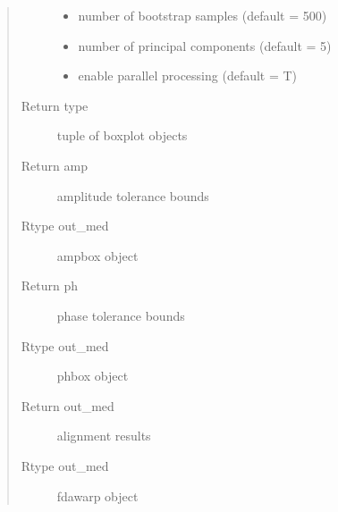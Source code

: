 \documentclass[letterpaper,10pt,english]{sphinxmanual}
\begin{document}
\begin{fulllineitems}
\begin{quote}
\begin{description}
\begin{itemize}
\item {} 
 \textendash{} number of bootstrap samples (default = 500)

\item {} 
 \textendash{} number of principal components (default = 5)

\item {} 
 \textendash{} enable parallel processing (default = T)

\end{itemize}

\item[{Return type}] \leavevmode
tuple of boxplot objects

\item[{Return amp}] \leavevmode
amplitude tolerance bounds

\item[{Rtype out\_med}] \leavevmode
ampbox object

\item[{Return ph}] \leavevmode
phase tolerance bounds

\item[{Rtype out\_med}] \leavevmode
phbox object

\item[{Return out\_med}] \leavevmode
alignment results

\item[{Rtype out\_med}] \leavevmode
fdawarp object

\end{description}\end{quote}

\end{fulllineitems}

\end{document}
